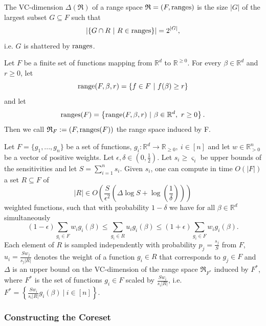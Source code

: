 \begin{definition}
    The VC-dimension $\Delta(\mathfrak{R})$ of a range space
    $\mathfrak{R} = (F, \textup{ranges})$ is
    the size $|G|$ of the largest subset $G \subseteq F$ such that
    \begin{equation*}
        \left| \left\{ G \cap R \ | \ R \in \textup{ranges} \right\} \right|
        = 2^{|G|},
    \end{equation*}
    i.e. $G$ is shattered by $\textup{ranges}$.
\end{definition}

\begin{definition}
    Let $F$ be a finite set of functions mapping from $\mathbb{R}^d$ to $\mathbb{R}^{\geq 0}$.
    For every $\beta \in \mathbb{R}^d$ and $r \geq 0$, let
    \begin{equation*}
        \textup{range}(F, \beta, r) = \left\{ f \in F \ | \  f(\beta) \geq r  \right\}
    \end{equation*}
    and let
    \begin{equation*}
        \textup{ranges}(F) = \left\{ \textup{range}(F, \beta, r) \ | \ \beta \in \mathbb{R}^d, \ r \geq 0  \right\}.
    \end{equation*}
    Then we call $\mathfrak{R}_F := (F, \textup{ranges}(F))$ the range space induced by F.
\end{definition}

\begin{theorem}
    Let $F = \{ g_1, ..., g_n \}$ be a set of functions,
    $g_i: \mathbb{R}^d \rightarrow \mathbb{R}_{\geq 0}, \ i \in [n]$
    and let $w \in \mathbb{R}^n_{>0}$ be a vector of positive weights.
    Let $\epsilon, \delta \in (0, \frac{1}{2})$.
    Let $s_i \geq \varsigma_i$ be upper bounds of the sensitivities and
    let $S = \sum_{i=1}^n s_i$.
    Given $s_i$, one can compute in time $O(|F|)$ a set
    $R \subseteq F$ of
    \begin{equation*}
        |R| \in O \left( \frac{S}{\epsilon^2} \left( \Delta \log S + \log \left( \frac{1}{\delta} \right) \right) \right)
    \end{equation*}
    weighted functions, such that with probability $1 - \delta$ we have
    for all $\beta \in \mathbb{R}^d$ simultaneously
    \begin{equation*}
        (1-\epsilon) \sum_{g_i \in F} w_i g_i(\beta) \leq \sum_{g_i \in R} u_i g_i(\beta) \leq (1 + \epsilon) \sum_{g_i \in F} w_i g_i(\beta).
    \end{equation*}
    Each element of $R$ is sampled independently with probability
    $p_j = \frac{s_j}{S}$ from $F$, $u_i = \frac{S w_j}{s_j |R|}$
    denotes the weight of a function $g_i \in R$ that corresponds to
    $g_j \in F$ and $\Delta$ is an upper bound on the
    VC-dimension of the range space $\mathfrak{R}_{F^*}$ induced by
    $F^*$, where $F^*$ is the set of functions $g_i \in F$
    scaled by $\frac{S w_i}{s_i |R|}$, i.e.
    $F^* = \left\{ \frac{S w_i}{s_i |R|} g_i(\beta) \ |\ i \in [n] \right\}$.
\end{theorem}

\subsubsection{Constructing the Coreset}

